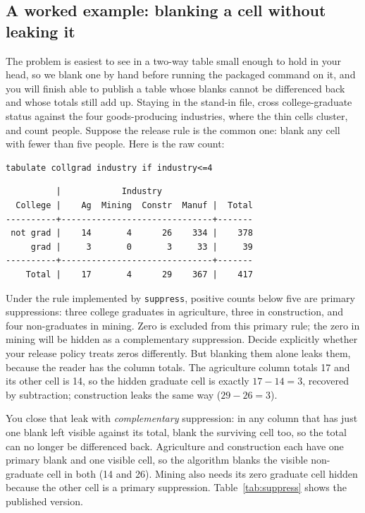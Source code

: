 \documentclass[
    a4paper,
    fontsize=10pt,
    twoside=true,
    numbers=noenddot,
]{kaobook}
\begin{document}
\subsection{A worked example: blanking a cell without leaking it}\label{sec:supexample}
The problem is easiest to see in a two-way table small enough to hold in your head, so we blank one by hand before running the packaged command on it, and you will finish able to publish a table whose blanks cannot be differenced back and whose totals still add up. Staying in the stand-in file, cross college-graduate status against the four goods-producing industries, where the thin cells cluster, and count people. Suppose the release rule is the common one: blank any cell with fewer than five people. Here is the raw count:
\par
{\footnotesize
\begin{verbatim}
tabulate collgrad industry if industry<=4
\end{verbatim}
}
\par
{\footnotesize
\begin{verbatim}
          |            Industry
  College |    Ag  Mining  Constr  Manuf |  Total
----------+------------------------------+-------
 not grad |    14       4      26    334 |    378
     grad |     3       0       3     33 |     39
----------+------------------------------+-------
    Total |    17       4      29    367 |    417
\end{verbatim}
}
Under the rule implemented by \texttt{suppress}, positive counts below five are primary suppressions: three college graduates in agriculture, three in construction, and four non-graduates in mining. Zero is excluded from this primary rule; the zero in mining will be hidden as a complementary suppression. Decide explicitly whether your release policy treats zeros differently. But blanking them alone leaks them, because the reader has the column totals. The agriculture column totals 17 and its other cell is 14, so the hidden graduate cell is exactly $17-14=3$, recovered by subtraction; construction leaks the same way ($29-26=3$). 

You close that leak with \emph{complementary} suppression: in any column that has just one blank left visible against its total, blank the surviving cell too, so the total can no longer be differenced back. Agriculture and construction each have one primary blank and one visible cell, so the algorithm blanks the visible non-graduate cell in both (14 and 26). Mining also needs its zero graduate cell hidden because the other cell is a primary suppression. Table~\ref{tab:suppress} shows the published version.
\end{document}
